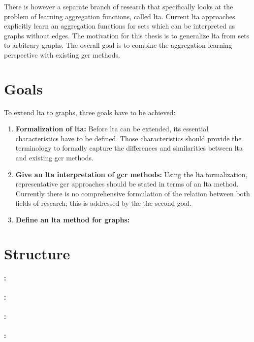 There is however a separate branch of research that specifically looks at the problem of learning aggregation functions, called \ac{lta}.
Current \ac{lta} approaches explicitly learn an aggregation functions for sets which can be interpreted as graphs without edges.
The motivation for this thesis is to generalize \ac{lta} from sets to arbitrary graphs.
The overall goal is to combine the aggregation learning perspective with existing \ac{gcr} methods.

\section{Goals}%
\label{sec:intro:goals}

To extend \ac{lta} to graphs, three goals have to be achieved:
\begin{enumerate}[label=\textbf{\arabic*.}]
	\item \textbf{Formalization of \ac{lta}:}
		Before \ac{lta} can be extended, its essential characteristics have to be defined.
		Those characteristics should provide the terminology to formally capture the differences and similarities between \ac{lta} and existing \ac{gcr} methods.
	\item \textbf{Give an \ac{lta} interpretation of \ac{gcr} methods:}
		Using the \ac{lta} formalization, representative \ac{gcr} approaches should be stated in terms of an \ac{lta} method.
		Currently there is no comprehensive formulation of the relation between both fields of research;
		this is addressed by the the second goal.
	\item \textbf{Define an \ac{lta} method for graphs:}

\end{enumerate}

\section{Structure}%
\label{sec:intro:structure}

\paragraph{: }

\paragraph{: }

\paragraph{: }

\paragraph{: }
